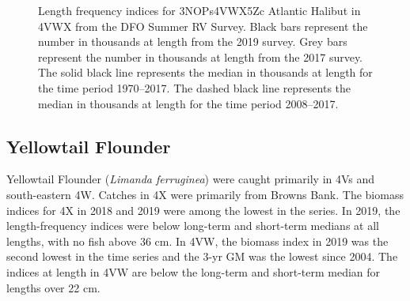 \documentclass[11pt]{book}
\begin{document}
\begin{figure}[htb]

{\centering {} 

}

\caption{Length frequency indices for 3NOPs4VWX5Zc Atlantic Halibut in 4VWX from the DFO Summer RV Survey. Black bars represent the number in thousands at length from the 2019 survey. Grey bars represent the number in thousands at length from the 2017 survey. The solid black line represents the median in thousands at length for the time period 1970--2017. The dashed black line represents the median in thousands at length for the time period 2008--2017.}\label{fig:44-fig-halibut-lengthfreq}
\end{figure}
\clearpage

\hypertarget{yellowtail-flounder}{%
\subsection{Yellowtail Flounder}\label{yellowtail-flounder}}

Yellowtail Flounder (\emph{Limanda ferruginea}) were caught primarily in 4Vs and south-eastern 4W. Catches in 4X were primarily from Browns Bank. The biomass indices for 4X in 2018 and 2019 were among the lowest in the series. In 2019, the length-frequency indices were below long-term and short-term medians at all lengths, with no fish above 36 cm. In 4VW, the biomass index in 2019 was the second lowest in the time series and the 3-yr GM was the lowest since 2004. The indices at length in 4VW are below the long-term and short-term median for lengths over 22 cm.
\end{document}

